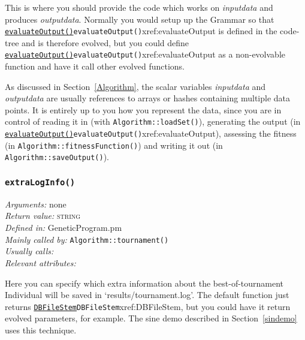 \documentclass[a4paper]{article}
\begin{document}
This is where you should provide the code which works on
\textit{inputdata} and produces \textit{outputdata}.  Normally you
would setup up the Grammar so that \hyperref[no]{\texttt{evaluateOutput()}}{\texttt{evaluateOutput()}}{xref:evaluateOutput} is
defined in the code-tree and is therefore evolved, but you could
define \hyperref[no]{\texttt{evaluateOutput()}}{\texttt{evaluateOutput()}}{xref:evaluateOutput} as a non-evolvable function and have
it call other evolved functions.

As discussed in Section~\ref{Algorithm}, the scalar variables
\textit{inputdata} and \textit{outputdata} are usually references to
arrays or hashes containing multiple data points.  It is entirely up
to you how you represent the data, since you are in control of reading
it in (with \texttt{Algorithm::loadSet()}), generating the output (in
\hyperref[no]{\texttt{evaluateOutput()}}{\texttt{evaluateOutput()}}{xref:evaluateOutput}), assessing the fitness (in
\texttt{Algorithm::fitnessFunction()}) and writing it out (in
\texttt{Algorithm::saveOutput()}).

\subsubsection{\texttt{extraLogInfo()}}\label{Individual::extraLogInfo}
\begin{flushleft}
\textit{Arguments:} none\\
\textit{Return value:} \textsc{string}\\
\textit{Defined in:} GeneticProgram.pm\\
\textit{Mainly called by:} \texttt{Algorithm::tournament()}\\
\textit{Usually calls:} \\
\textit{Relevant attributes:}
\end{flushleft}

Here you can specify which extra information about the
best-of-tournament Individual will be saved in
`results/tournament.log'.  The default function just returns
\hyperref[no]{\texttt{DBFileStem}}{\texttt{DBFileStem}}{xref:DBFileStem}, but you could have it return evolved parameters,
for example.  The sine demo described in Section~\ref{sindemo} uses
this technique.  
\end{document}
